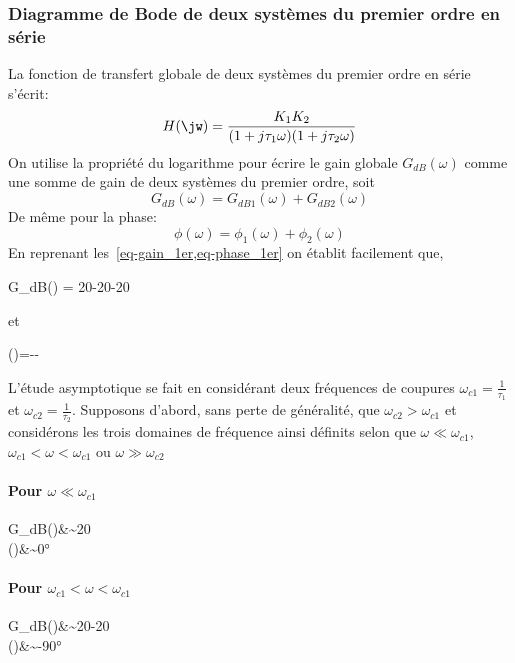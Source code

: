 \subsubsection{Diagramme de Bode de deux systèmes du premier ordre en série }
La fonction de transfert globale de deux systèmes du premier ordre en série s'écrit:
\begin{align}
    H(\jw)=\dfrac{K_1K_2}{(1+j\tau_1\omega)(1+j\tau_2\omega)}\label{eq-1er_serie}
\end{align}
On utilise la propriété du logarithme pour écrire le gain globale $G_{dB}(\omega)$ comme une somme de 
gain de deux systèmes du premier ordre, soit
$$
G_{dB}(\omega) = G_{dB1}(\omega) + G_{dB2}(\omega)
$$
De même pour la phase:
$$
\phi(\omega)= \phi_1(\omega) + \phi_2(\omega)
$$
En reprenant les~\cref{eq-gain_1er,eq-phase_1er} on établit facilement que,
\begin{bequation}
    G_{dB}(\omega) = 20-20-20
\end{bequation}
et
\begin{bequation}
\phi(\omega)=-\arctan{\tau_1\omega}-\arctan{\tau_2\omega}
\end{bequation}

L'étude asymptotique se fait en considérant deux fréquences de coupures 
$\omega_{c1}=\frac{1}{\tau_1}$ et $\omega_{c2}=\frac{1}{\tau_2}$.
Supposons d'abord, sans perte de généralité, que $\omega_{c2}>\omega_{c1}$ et considérons 
les trois domaines de fréquence ainsi définits selon que $\omega\ll\omega_{c1}$, $\omega_{c1}<\omega<\omega_{c1}$ ou 
$\omega\gg\omega_{c2}$

\paragraph{Pour $\omega\ll\omega_{c1}$}
\begin{bequation}
G_{dB}(\omega)&\sim20\\
    \phi(\omega)&\sim0\si{\degree}
\end{bequation}

\paragraph{Pour $\omega_{c1}<\omega<\omega_{c1}$}
\begin{bequation}
    G_{dB}(\omega)&\sim20-20\\
    \phi(\omega)&\sim-90\si{\degree}
\end{bequation}

